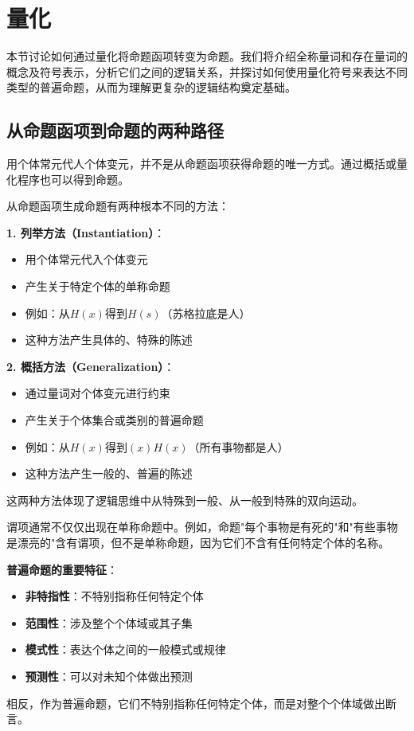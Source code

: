 \section{量化}

\begin{logicbox}[title=引言]
本节讨论如何通过量化将命题函项转变为命题。我们将介绍全称量词和存在量词的概念及符号表示，分析它们之间的逻辑关系，并探讨如何使用量化符号来表达不同类型的普遍命题，从而为理解更复杂的逻辑结构奠定基础。
\end{logicbox}

\subsection{从命题函项到命题的两种路径}

用个体常元代人个体变元，并不是从命题函项获得命题的唯一方式。通过概括或量化程序也可以得到命题。

\begin{theorembox}[title=生成命题的两种基本方法]
从命题函项生成命题有两种根本不同的方法：

\textbf{1. 列举方法（Instantiation）}：
\begin{itemize}
\item 用个体常元代入个体变元
\item 产生关于特定个体的单称命题
\item 例如：从$H(x)$得到$H(s)$（苏格拉底是人）
\item 这种方法产生具体的、特殊的陈述
\end{itemize}

\textbf{2. 概括方法（Generalization）}：
\begin{itemize}
\item 通过量词对个体变元进行约束
\item 产生关于个体集合或类别的普遍命题
\item 例如：从$H(x)$得到$(x)H(x)$（所有事物都是人）
\item 这种方法产生一般的、普遍的陈述
\end{itemize}

这两种方法体现了逻辑思维中从特殊到一般、从一般到特殊的双向运动。
\end{theorembox}

\begin{examplebox}[title=普遍命题的特征]
谓项通常不仅仅出现在单称命题中。例如，命题"每个事物是有死的"和"有些事物是漂亮的"含有谓项，但不是单称命题，因为它们不含有任何特定个体的名称。

\textbf{普遍命题的重要特征}：
\begin{itemize}
\item \textbf{非特指性}：不特别指称任何特定个体
\item \textbf{范围性}：涉及整个个体域或其子集
\item \textbf{模式性}：表达个体之间的一般模式或规律
\item \textbf{预测性}：可以对未知个体做出预测
\end{itemize}

相反，作为普遍命题，它们不特别指称任何特定个体，而是对整个个体域做出断言。
\end{examplebox}

